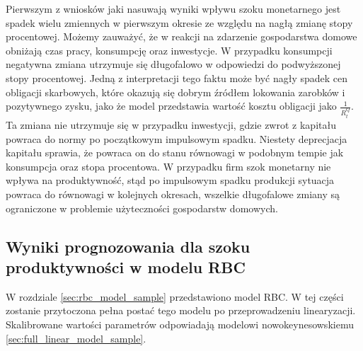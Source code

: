 Pierwszym z wniosków jaki nasuwają wyniki wpływu szoku monetarnego jest spadek wielu zmiennych w pierwszym okresie ze względu na nagłą zmianę stopy procentowej. Możemy zauważyć, że w reakcji na zdarzenie gospodarstwa domowe obniżają czas pracy, konsumpcję oraz inwestycje. W przypadku konsumpcji negatywna zmiana utrzymuje się długofalowo w odpowiedzi do podwyższonej stopy procentowej. Jedną z interpretacji tego faktu może być nagły spadek cen obligacji skarbowych, które okazują się dobrym źródłem lokowania zarobków i pozytywnego zysku, jako że model przedstawia wartość kosztu obligacji jako $\frac{1}{R_t^Q}$. Ta zmiana nie utrzymuje się w przypadku inwestycji, gdzie zwrot z kapitału powraca do normy po początkowym impulsowym spadku. Niestety deprecjacja kapitału sprawia, że powraca on do stanu równowagi w podobnym tempie jak konsumpcja oraz stopa procentowa. W przypadku firm szok monetarny nie wpływa na produktywność, stąd po impulsowym spadku produkcji sytuacja powraca do równowagi w kolejnych okresach, wszelkie długofalowe zmiany są ograniczone w problemie użyteczności gospodarstw domowych.

\subsection{Wyniki prognozowania dla szoku produktywności w modelu RBC}
\label{sec:results_rbc_prod}

W rozdziale \ref{sec:rbc_model_sample} przedstawiono model RBC. W tej części zostanie przytoczona pełna postać tego modelu po przeprowadzeniu linearyzacji. Skalibrowane wartości parametrów odpowiadają modelowi nowokeynesowskiemu \ref{sec:full_linear_model_sample}.

